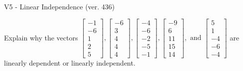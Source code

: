 \begin{exercise}
  \begin{exerciseTitle}V5 - Linear Independence (ver. 436)\end{exerciseTitle}
  \begin{exerciseStatement}
    Explain why the vectors \(\left[\begin{array}{r}
-1 \\
-6 \\
1 \\
2 \\
5
\end{array}\right] , \left[\begin{array}{r}
-6 \\
3 \\
4 \\
4 \\
4
\end{array}\right] , \left[\begin{array}{r}
-4 \\
-6 \\
-2 \\
-5 \\
-1
\end{array}\right] , \left[\begin{array}{r}
-9 \\
6 \\
11 \\
15 \\
14
\end{array}\right] , \text{ and } \left[\begin{array}{r}
5 \\
1 \\
-4 \\
-6 \\
-4
\end{array}\right]\) are linearly dependent or linearly independent.	



\end{exerciseStatement}
\end{exercise}
